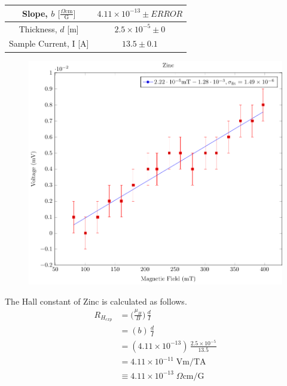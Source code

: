 \documentclass[a4paper]{article}
\begin{document}
\begin{center}
\begin{tabular}{|c|c|}
\hline
Slope, $b$ $\big[  \frac{\Omega \text{cm}}{\text{G}} \big] $ & $4.11 \times 10^{-13} \pm ERROR$ \topVspace \bottomVspace \\
\hline
Thickness, $d$ [m] & $2.5 \times 10^{-5} \pm 0$ \topVspace \bottomVspace \\
\hline
Sample Current, I [A] & $13.5 \pm 0.1$ \topVspace \bottomVspace \\
\hline
\end{tabular}
\label{table:zinc_RH}
\end{center}

\begin{figure}[H]
  \begin{center}
    \includegraphics[scale=0.7]{ZincPlot/zincPlot.pdf}
  \end{center}
\end{figure}

The Hall constant of Zinc is calculated as follows.
\begin{align*}
R_{H_{exp}} &= \big( \frac{\mu_H}{B} \big) \, \frac{d}{I} \\
    &= (b) \, \frac{d}{I} \\
    &= (4.11 \times 10^{-13}) \, \frac{2.5 \times 10^{-5}}{13.5} \\
    &= 4.11 \times 10^{-11} \; \text{Vm/TA} \\
    &\equiv 4.11 \times 10^{-13} \; \Omega \text{cm/G} \\
\end{align*}
\end{document}

